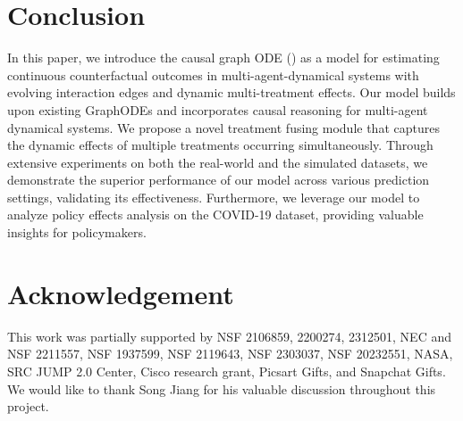 \section{Conclusion}
In this paper, we introduce the causal graph ODE (\model) as a model for estimating continuous counterfactual outcomes in multi-agent-dynamical systems with evolving interaction edges and dynamic multi-treatment effects. Our model builds upon existing GraphODEs and incorporates causal reasoning for multi-agent dynamical systems. We propose a novel treatment fusing module that captures the dynamic effects of multiple treatments occurring simultaneously. Through extensive experiments on both the real-world and the simulated datasets, we demonstrate the superior performance of our model across various prediction settings, validating its effectiveness. Furthermore, we leverage our model to analyze policy effects analysis on the COVID-19 dataset, providing valuable insights for policymakers.

\section{Acknowledgement}
This work was partially supported by NSF 2106859, 2200274, 2312501, NEC and NSF 2211557, NSF 1937599, NSF 2119643, NSF 2303037, NSF 20232551, NASA, SRC JUMP 2.0 Center, Cisco research grant, Picsart Gifts, and Snapchat Gifts. We would like to thank Song Jiang for his valuable discussion throughout this project.